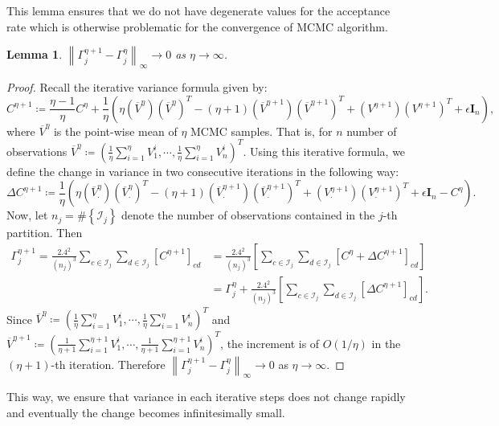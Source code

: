 \documentclass[
12pt]{article}
\newtheorem{lemma}{Lemma}[section]
\begin{document}
This lemma ensures that we do not have degenerate values for the acceptance rate which is otherwise problematic for the convergence of MCMC algorithm.

\begin{lemma}\label{lemm:stable:var}
	$\left\|\Gamma^{\eta+1}_{j} - \Gamma^{\eta}_{j}\right\|_{\infty}\to 0$ as $\eta\to\infty$.
\end{lemma}

\begin{proof}
	Recall the iterative variance formula given by:
	\begin{equation*}
		C^{\eta+1} \coloneqq 
		\frac{\eta-1}{\eta} C^{\eta} 
		+ \frac{1}{\eta}\left(\eta 
		\left(\overline{V}^{\eta}\right)\left(\overline{V}^{\eta}\right)^T 
		- (\eta+1)\left(\overline{V}^{\eta+1}\right)\left(\overline{V}^{\eta+1}\right)^T 
		+ \left({V}^{\eta+1}\right)\left({V}^{\eta+1}\right)^T + \epsilon\mathbf{I}_n\right),
	\end{equation*}
	where $\overline{V}^{\eta}$ is the point-wise mean of $\eta$ MCMC samples. That is, for $n$ number of observations $\overline{V}^{\eta} \coloneqq \left(\frac{1}{\eta}\sum_{i=1}^\eta V_1^i,\cdots, \frac{1}{\eta}\sum_{i=1}^\eta V_n^i\right)^T$. Using this iterative formula, we define the change in variance in two consecutive iterations in the following way:
	\begin{equation*}
		\Delta C^{\eta + 1} \coloneqq \frac{1}{\eta}\left(\eta \left(\overline{V}_{\cdot }^{\eta}\right)\left(\overline{V}_{\cdot }^{\eta}\right)^T 
		- (\eta+1)\left(\overline{V}_{\cdot }^{\eta+1}\right)\left(\overline{V}_{\cdot }^{\eta+1}\right)^T 
		+ \left({V}_{\cdot }^{\eta+1}\right)\left({V}_{\cdot }^{\eta+1}\right)^T + \epsilon\mathbf{I}_n - C^{\eta}\right).
	\end{equation*}
	Now, let $ n_j = \#\left\{\mathcal{I}_{j}\right\}$ denote the number of observations contained in the $j$-th partition. Then
	\begin{align*}
		\Gamma^{\eta+1}_j 
		= \frac{2.4^2}{\left(n_{j}\right)^3}
		\sum_{c\in\mathcal{I}_{j}}\sum_{d\in\mathcal{I}_{j}}\left[C^{\eta+1}\right]_{cd}
		&= \frac{2.4^2}{\left(n_{j}\right)^3}
		\left[\sum_{c\in\mathcal{I}_{j}}\sum_{d\in\mathcal{I}_{j}}\left[C^{\eta} + \Delta C^{\eta + 1}\right]_{cd}\right] \\
		&= \Gamma^{\eta}_j + \frac{2.4^2}{\left(n_{j}\right)^3} \left[\sum_{c\in\mathcal{I}_{j}}\sum_{d\in\mathcal{I}_{j}}\left[\Delta C^{\eta + 1}\right]_{cd}\right].
	\end{align*}
	Since $\overline{V}^{\eta} \coloneqq \left(\frac{1}{\eta}\sum_{i=1}^\eta V_1^i,\cdots, \frac{1}{\eta}\sum_{i=1}^\eta V_n^i\right)^T$ and $\overline{V}^{\eta+1} \coloneqq \left(\frac{1}{\eta+1}\sum_{i=1}^{\eta+1} V_1^i,\cdots, \frac{1}{\eta+1}\sum_{i=1}^{\eta+1} V_n^i\right)^T$, the increment is of $O(1/\eta)$ in the $(\eta +1)$-th iteration. Therefore $\left\|\Gamma^{\eta+1}_j - \Gamma^{\eta}_j\right\|_{\infty} \to 0$ as $\eta\to \infty$.
\end{proof}
This way, we ensure that variance in each iterative steps does not change rapidly and eventually the change becomes infinitesimally small.
\end{document}
